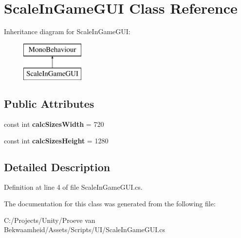 \hypertarget{class_scale_in_game_g_u_i}{\section{Scale\+In\+Game\+G\+U\+I Class Reference}
\label{class_scale_in_game_g_u_i}
}
Inheritance diagram for Scale\+In\+Game\+G\+U\+I\+:\begin{figure}[H]
\begin{center}
\leavevmode
\includegraphics[height=2.000000cm]{class_scale_in_game_g_u_i}
\end{center}
\end{figure}
\subsection*{Public Attributes}
\begin{DoxyCompactItemize}
\item 
\hypertarget{class_scale_in_game_g_u_i_ad1e5aa3fc09488374a71b38602f16f93}{const int {\bfseries calc\+Sizes\+Width} = 720}\label{class_scale_in_game_g_u_i_ad1e5aa3fc09488374a71b38602f16f93}

\item 
\hypertarget{class_scale_in_game_g_u_i_a63c80e42c3125a8b865b812c9e1f5d70}{const int {\bfseries calc\+Sizes\+Height} = 1280}\label{class_scale_in_game_g_u_i_a63c80e42c3125a8b865b812c9e1f5d70}

\end{DoxyCompactItemize}


\subsection{Detailed Description}


Definition at line 4 of file Scale\+In\+Game\+G\+U\+I.\+cs.



The documentation for this class was generated from the following file\+:\begin{DoxyCompactItemize}
\item 
C\+:/\+Projects/\+Unity/\+Proeve van Bekwaamheid/\+Assets/\+Scripts/\+U\+I/Scale\+In\+Game\+G\+U\+I.\+cs\end{DoxyCompactItemize}
